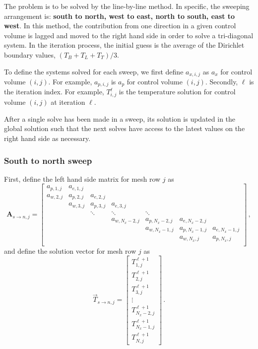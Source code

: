 \documentclass{article}
\begin{document}
The problem is to be solved by the line-by-line method. In specific, the sweeping arrangement is: \textbf{south to north, west to east, north to south, east to west}. In this method, the contribution from one direction in a given control volume is lagged and moved to the right hand side in order to solve a tri-diagonal system. In the iteration process, the initial guess is the average of the Dirichlet boundary values, $(T_B + T_L + T_T) / 3$.

To define the systems solved for each sweep, we first define $a_{x,i,j}$ as $a_x$ for control volume $(i, j)$. For example, $a_{p, i, j}$ is $a_p$ for control volume $(i, j)$. Secondly, $\ell$ is the iteration index. For example, $T_{i,j}^\ell$ is the temperature solution for control volume $(i, j)$ at iteration $\ell$.

After a single solve has been made in a sweep, its solution is updated in the global solution such that the next solves have access to the latest values on the right hand side as necessary.

\subsubsection*{South to north sweep}

\def\arraystretch{1.4}

First, define the left hand side matrix for mesh row $j$ as
\begin{equation}
	\label{eq:lhs_j}
	\mathbf{A}_{s\to n, j} =
	\begin{bmatrix}
		a_{p,1,j} & a_{e,1,j} \\
		a_{w,2,j} & a_{p,2,j} & a_{e,2,j} \\
		& a_{w,3,j} & a_{p,3,j} & a_{e,3,j} \\
		& & \ddots & \ddots & \ddots \\
		& & &  a_{w, N_x - 2, j} & a_{p, N_x - 2, j} & a_{e, N_x - 2, j} \\
		& & & & a_{w, N_x - 1, j} & a_{p, N_x - 1, j} & a_{e, N_x - 1, j} \\
		& & & & & a_{w, N_x, j} & a_{p, N_x, j} \\
	\end{bmatrix}\,,
\end{equation}
and define the solution vector for mesh row $j$ as
\begin{equation}
	\label{eq:rhs_j}
	\vec{T}_{s\to n, j} =
	\begin{bmatrix}
		T_{1, j}^{\ell + 1} \\
		T_{2, j}^{\ell + 1} \\
		T_{3, j}^{\ell + 1} \\
		\vdots \\
		T_{N_x - 2, j}^{\ell + 1} \\
		T_{N_x - 1, j}^{\ell + 1} \\
		T_{N, j}^{\ell + 1}
	\end{bmatrix}\,.
\end{equation}
\end{document}
